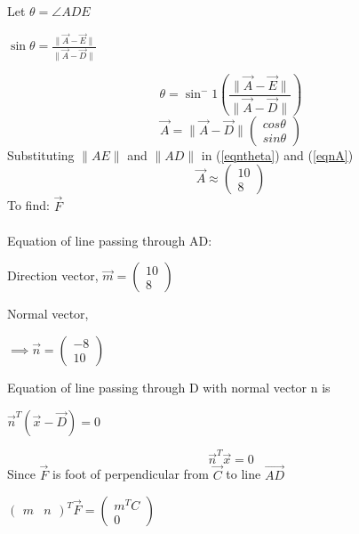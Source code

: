 \documentclass[letterpaper,12pt]{article}
\begin{document}
Let $\theta = \angle ADE$
\begin{center}
    $\sin \theta = \frac{\|\Vec{A}-\Vec{E}\|}{\|\Vec{A}-\Vec{D}\|}$
\end{center}
\begin{equation}
    \theta = \sin^-1\left(\frac{\|\Vec{A}-\Vec{E}\|}{\|\Vec{A}-\Vec{D}\|}\right)
\label{eqntheta}
\end{equation}
\begin{equation}
    \Vec{A} = \|\Vec{A}-\Vec{D}\|\begin{pmatrix} cos \theta \\ sin \theta \end{pmatrix}
\label{eqnA}
\end{equation}
Substituting $\|AE\|$ and $\|AD\|$ in (\ref*{eqntheta}) and (\ref*{eqnA})
\begin{equation}
    \Vec{A} \approx \begin{pmatrix} 10 \\ 8 \end{pmatrix}
\end{equation}
To find: $\Vec{F}$ \\ \\
Equation of line passing through AD:
\begin{center}
    Direction vector, $\Vec{m} = \begin{pmatrix} 10 \\ 8 \end{pmatrix}$
\end{center}
Normal vector,
\begin{center}
    $\implies \Vec{n} = \begin{pmatrix} -8 \\ 10 \end{pmatrix}$
\end{center}
Equation of line passing through D with normal vector n is
\begin{center}
    $\Vec{n}^T(\Vec{x} - \Vec{D}) = 0$
\end{center}
\begin{equation}
    \Vec{n}^T\Vec{x} = 0
\end{equation}
Since $\Vec{F}$ is foot of perpendicular from $\Vec{C}$ to line $\Vec{AD}$
\begin{center}
    $\begin{pmatrix}m & n\end{pmatrix}^T\Vec{F} = \begin{pmatrix} m^TC \\ 0 \end{pmatrix}$
\end{center}
\end{document}
